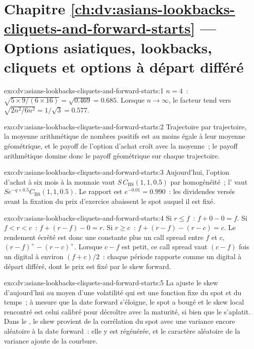 \section*{Chapitre \ref{ch:dv:asians-lookbacks-cliquets-and-forward-starts} --- Options asiatiques, lookbacks, cliquets et options à départ différé}

\begin{solution}{exo:dv:asians-lookbacks-cliquets-and-forward-starts:1}
$n=4$~: $\sqrt{5\times9/(6\times16)}=\sqrt{0.469}=0.685$. Lorsque $n\to\infty$, le facteur tend vers $\sqrt{2n^2/6n^2}=1/\sqrt3=0.577$.
\end{solution}

\begin{solution}{exo:dv:asians-lookbacks-cliquets-and-forward-starts:2}
Trajectoire par trajectoire, la moyenne arithmétique de nombres positifs est au moins égale à leur moyenne géométrique, et le payoff de l'option d'achat croît
avec la moyenne~; le payoff arithmétique domine donc le payoff géométrique sur chaque trajectoire.
\end{solution}

\begin{solution}{exo:dv:asians-lookbacks-cliquets-and-forward-starts:3}
Aujourd'hui, l'option d'achat à six mois à la monnaie vaut $S\,C_{\mathrm{BS}}(1,1,0.5)$ par homogénéité~; l' vaut
$Se^{-q\times0.5}C_{\mathrm{BS}}(1,1,0.5)$. Le rapport est $e^{-0.01}=0.990$~: les dividendes versés avant la fixation du prix d'exercice abaissent
le spot auquel il est fixé.
\end{solution}

\begin{solution}{exo:dv:asians-lookbacks-cliquets-and-forward-starts:4}
Si $r\le f$~: $f+0-0=f$. Si $f<r<c$~: $f+(r-f)-0=r$. Si $r\ge c$~: $f+(r-f)-(r-c)=c$. Le rendement écrêté est donc une constante plus un
call spread entre $f$ et $c$, $(r-f)^+-(r-c)^+$. Lorsque $c-f$ est petit, ce call spread vaut $(c-f)$ fois un digital à environ $(f+c)/2$~: chaque période
rapporte comme un digital à départ différé, dont le prix est fixé par le skew forward.
\end{solution}

\begin{solution}{exo:dv:asians-lookbacks-cliquets-and-forward-starts:5}
La  ajuste le skew d'aujourd'hui au moyen d'une volatilité qui est une fonction fixe du spot et du temps~; à mesure que la date forward
s'éloigne, le spot a bougé et le skew local rencontré est celui calibré pour décroître avec la maturité, si bien que le
 s'aplatit. Dans le , le skew provient de la corrélation du spot avec une variance encore aléatoire à la
date forward~: elle y est régénérée, et le caractère aléatoire de la variance ajoute de la courbure.
\end{solution}

